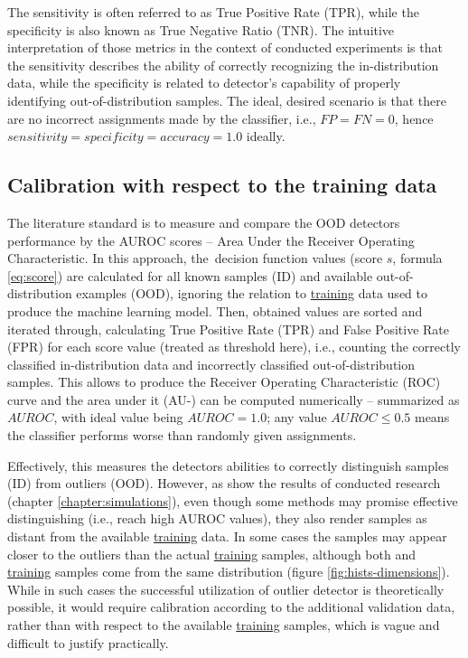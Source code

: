The sensitivity is often referred to as True Positive Rate (TPR), while the specificity is also known as True Negative Ratio (TNR). The intuitive interpretation of those metrics in the context of conducted experiments is that the sensitivity describes the ability of correctly recognizing the in-distribution data, while the specificity is related to detector's capability of properly identifying out-of-distribution samples. The ideal, desired scenario is that there are no incorrect assignments made by the classifier, i.e., $FP = FN = 0$, hence $sensitivity = specificity = accuracy = 1.0$ ideally.


\subsection{Calibration with respect to the training data}
\label{section:calibration}

The literature standard is to measure and compare the OOD detectors performance by the AUROC scores – Area Under the Receiver Operating Characteristic. In this approach, the~decision function values (score $s$, formula \ref{eq:score}) are calculated for all known  samples (ID) and available out-of-distribution examples (OOD), ignoring the relation to \underline{training} data used to produce the machine learning model. Then, obtained values are sorted and iterated through, calculating True Positive Rate (TPR) and False Positive Rate (FPR) for each score value (treated as threshold here), i.e., counting the correctly classified in-distribution data and incorrectly classified out-of-distribution samples. This allows to produce the Receiver Operating Characteristic (ROC) curve and the area under it (AU-) can be computed numerically – summarized as $AUROC$, with ideal value being $AUROC = 1.0$; any value $AUROC \leq 0.5$ means the classifier performs worse than randomly given assignments.

Effectively, this measures the detectors abilities to correctly distinguish  samples (ID) from outliers (OOD). However, as show the results of conducted research (chapter \ref{chapter:simulations}), even though some methods may promise effective distinguishing (i.e., reach high AUROC values), they also render  samples as distant from the available \underline{training} data. In some cases the  samples may appear closer to the outliers than the actual \underline{training} samples, although both  and \underline{training} samples come from the same distribution (figure \ref{fig:hists-dimensions}). While in such cases the successful utilization of outlier detector is theoretically possible, it would require calibration according to the additional validation data, rather than with respect to the available \underline{training} samples, which is vague and difficult to justify practically.

